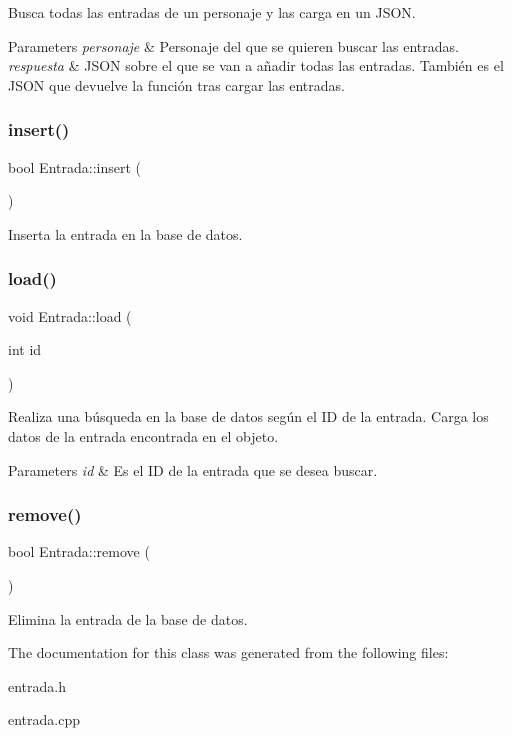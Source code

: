 Busca todas las entradas de un personaje y las carga en un J\+S\+ON. 
\begin{DoxyParams}{Parameters}
{\em personaje} & Personaje del que se quieren buscar las entradas. \\
\hline
{\em respuesta} & J\+S\+ON sobre el que se van a añadir todas las entradas. También es el J\+S\+ON que devuelve la función tras cargar las entradas. \\
\hline
\end{DoxyParams}
\mbox{\label{classEntrada_af6ef4854f5d9040117278ffe65eac8a3}} 
\subsubsection{\texorpdfstring{insert()}{insert()}}
{\footnotesize\ttfamily bool Entrada\+::insert (\begin{DoxyParamCaption}{ }\end{DoxyParamCaption})}

Inserta la entrada en la base de datos. \mbox{\label{classEntrada_a1b4cadcad1ba9665c73b3515eaad16cc}} 
\subsubsection{\texorpdfstring{load()}{load()}}
{\footnotesize\ttfamily void Entrada\+::load (\begin{DoxyParamCaption}\item[{int}]{id }\end{DoxyParamCaption})}

Realiza una búsqueda en la base de datos según el ID de la entrada. Carga los datos de la entrada encontrada en el objeto. 
\begin{DoxyParams}{Parameters}
{\em id} & Es el ID de la entrada que se desea buscar. \\
\hline
\end{DoxyParams}
\mbox{\label{classEntrada_a352b5c6fad6fe043a06625c995b78e32}} 
\subsubsection{\texorpdfstring{remove()}{remove()}}
{\footnotesize\ttfamily bool Entrada\+::remove (\begin{DoxyParamCaption}{ }\end{DoxyParamCaption})}

Elimina la entrada de la base de datos. 

The documentation for this class was generated from the following files\+:\begin{DoxyCompactItemize}
\item 
entrada.\+h\item 
entrada.\+cpp\end{DoxyCompactItemize}
